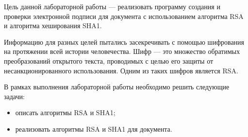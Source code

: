 \Introduction

Цель данной лабораторной работы --- реализовать программу создания и проверки электронной подписи для документа с использованием алгоритма RSA и алгоритма хеширования SHA1.

Информацию для разных целей пытались засекречивать с помощью шифрования на протяжении всей истории человечества. Шифр --- это множество обратимых преобразований открытого текста, проводимых с целью его защиты от несанкционированного использования. Одним из таких шифров является RSA.

В рамках выполнения лабораторной работы необходимо решить следующие задачи: 
\begin{itemize}
	\item описать алгоритмы RSA и SHA1;
	\item реализовать алгоритмы RSA и SHA1 для документа.
\end{itemize}
